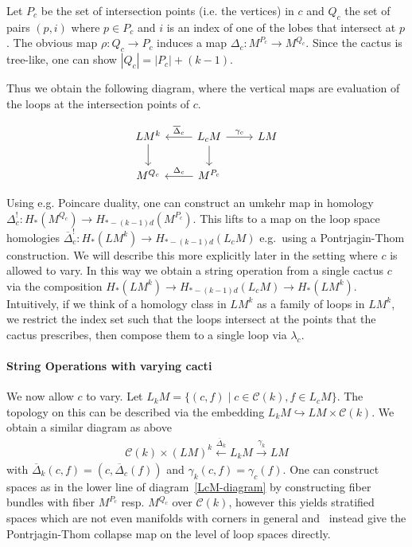 \documentclass{scrartcl}
\theoremstyle{plain}
\theoremstyle{definition}
\newcommand{\abs}[1]{\left\lvert#1\right\rvert}
\begin{document}
Let $P_c$ be the set of intersection points (i.e. the vertices) in $c$ and $Q_c$ the set of pairs $(p, i)$ where $p\in P_c$ and $i$ is an index of one of the lobes that intersect at $p$. The obvious map $\rho\colon Q_c\to P_c$ induces a map $\Delta_c \colon M^{P_c} \to M^{Q_c}$. Since the cactus is tree-like, one can show $\abs{Q_c} = \abs{P_c} + (k-1)$.

Thus we obtain the following diagram, where the vertical maps are evaluation of the loops at the intersection points of $c$. 

\begin{equation}\label{LcM-diagram}
\begin{tikzcd}
    LM^k \arrow[d]
    & L_cM \arrow[l, swap, "\overline\Delta_c"]\arrow[d] \arrow[r, "\gamma_c"] & LM \\
    M^{Q_c} & M^{P_c} \arrow [l, swap, "\Delta_c"] & 
\end{tikzcd}
\end{equation}

Using e.g. Poincare duality, one can construct an umkehr map in homology $\Delta_c^!\colon H_*(M^{Q_c}) \to H_{*-(k-1)d}(M^{P_c})$. This lifts to a map on the loop space homologies $\overline{\Delta}_c^!\colon H_*(LM^k) \to H_{*-(k-1)d}(L_c M)$ e.g.\ using a Pontrjagin-Thom construction. We will describe this more explicitly later in the setting where $c$ is allowed to vary. In this way we obtain a string operation from a single cactus $c$ via the composition $H_*(LM^k) \to H_{*-(k-1)d}(L_c M) \to H_*(LM^k)$. Intuitively, if we think of a homology class in $LM^k$ as a family of loops in $LM^k$, we restrict the index set such that the loops intersect at the points that the cactus prescribes, then compose them to a single loop via $\lambda_c$.

\paragraph{String Operations with varying cacti} We now allow $c$ to vary. Let $L_k M =\{(c, f) \mid c\in \mathcal C(k), f\in L_c M\}$. The topology on this can be described via the embedding $L_kM \hookrightarrow LM\times\mathcal{C}(k)$. We obtain a similar diagram as above
\begin{align}
    \mathcal C(k) \times {(LM)}^k \xleftarrow{\overline\Delta_k} L_k M \xrightarrow{\gamma_k} LM \label{cactus_loop_action}
\end{align}
with $\overline{\Delta}_k(c, f) = (c, \overline{\Delta}_c(f))$ and $\gamma_k(c,f) = \gamma_c(f)$. One can construct spaces as in the lower line of diagram~\ref{LcM-diagram} by constructing fiber bundles with fiber $M^{P_c}$ resp. $M^{Q_c}$ over $\mathcal C(k)$, however this yields stratified spaces which are not even manifolds with corners in general and~\cite{cohen2002homotopy} instead give the Pontrjagin-Thom collapse map on the level of loop spaces directly. 
\end{document}
